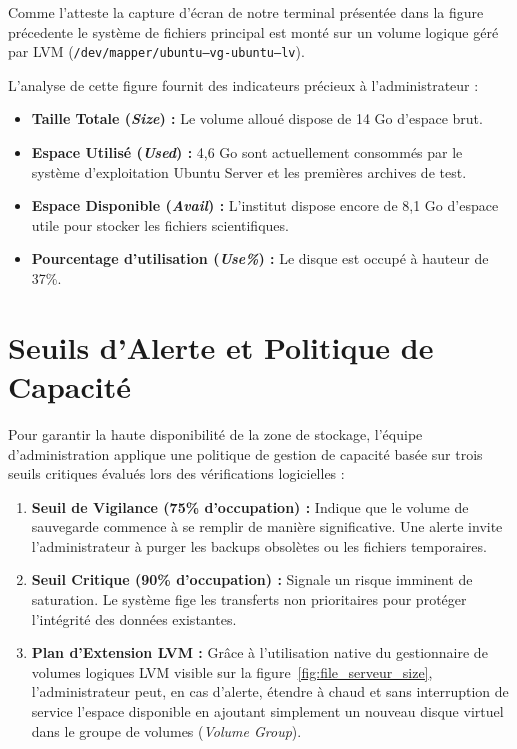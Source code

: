 Comme l'atteste la capture d'écran de notre terminal présentée dans la figure précedente le système de fichiers principal est monté sur un volume logique géré par LVM (\texttt{/dev/mapper/ubuntu\string--vg-ubuntu\string--lv}).

L'analyse de cette figure fournit des indicateurs précieux à l'administrateur :
\begin{itemize}
    \item \textbf{Taille Totale (\textit{Size}) :} Le volume alloué dispose de 14 Go d'espace brut.
    \item \textbf{Espace Utilisé (\textit{Used}) :} 4,6 Go sont actuellement consommés par le système d'exploitation Ubuntu Server et les premières archives de test.
    \item \textbf{Espace Disponible (\textit{Avail}) :} L'institut dispose encore de 8,1 Go d'espace utile pour stocker les fichiers scientifiques.
    \item \textbf{Pourcentage d'utilisation (\textit{Use\%}) :} Le disque est occupé à hauteur de 37\%.
\end{itemize}

\section{Seuils d'Alerte et Politique de Capacité}
Pour garantir la haute disponibilité de la zone de stockage, l'équipe d'administration applique une politique de gestion de capacité basée sur trois seuils critiques évalués lors des vérifications logicielles :
\begin{enumerate}
    \item \textbf{Seuil de Vigilance (75\% d'occupation) :} Indique que le volume de sauvegarde commence à se remplir de manière significative. Une alerte invite l'administrateur à purger les backups obsolètes ou les fichiers temporaires.
    \item \textbf{Seuil Critique (90\% d'occupation) :} Signale un risque imminent de saturation. Le système fige les transferts non prioritaires pour protéger l'intégrité des données existantes.
    \item \textbf{Plan d'Extension LVM :} Grâce à l'utilisation native du gestionnaire de volumes logiques LVM visible sur la figure~\ref{fig:file_serveur_size}, l'administrateur peut, en cas d'alerte, étendre à chaud et sans interruption de service l'espace disponible en ajoutant simplement un nouveau disque virtuel dans le groupe de volumes (\textit{Volume Group}).
\end{enumerate}